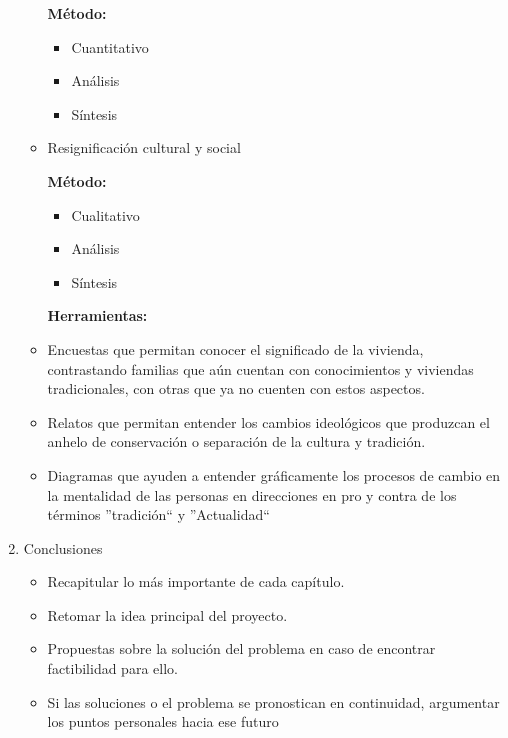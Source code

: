 \begin{enumerate}
\begin{itemize}
        \textbf{Método:}
        \begin{itemize}
          \item Cuantitativo
          \item Análisis
          \item Síntesis
        \end{itemize}

      \item Resignificación cultural y social
        
        \textbf{Método:}
        \begin{itemize}
          \item Cualitativo
          \item Análisis
          \item Síntesis
        \end{itemize}

      \textbf{Herramientas:}
      \item Encuestas que permitan conocer el significado de la vivienda, contrastando familias que aún cuentan con conocimientos y viviendas tradicionales, con otras que ya no cuenten con estos aspectos.
      \item Relatos que permitan entender los cambios ideológicos que produzcan el anhelo de conservación o separación de la cultura y tradición.
      \item Diagramas que ayuden a entender gráficamente los procesos de cambio en la mentalidad de las personas en direcciones en pro y contra de los términos ''tradición`` y ''Actualidad``
    \end{itemize}

  \item Conclusiones
      \begin{itemize}
        \item Recapitular lo más importante de cada capítulo.
        \item Retomar la idea principal del proyecto.
        \item Propuestas sobre la solución del problema en caso de encontrar factibilidad para ello.
        \item Si las soluciones o el problema se pronostican en continuidad, argumentar los puntos personales hacia ese futuro
      \end{itemize}

\end{enumerate}
